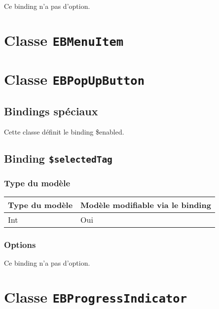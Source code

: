 Ce binding n'a pas d'option.








\section{Classe \texttt{EBMenuItem}}








\section{Classe \texttt{EBPopUpButton}}

\subsection{Bindings spéciaux}

Cette classe définit le binding \$enabled.

\subsection{Binding \texttt{\$selectedTag}}

\subsubsection{Type du modèle}

\begin{tabular}{|l|l|}
\hline
\textbf{Type du modèle} & \textbf{Modèle modifiable via le binding}\\
\hline
Int & Oui\\
\hline
\end{tabular}
\subsubsection{Options}

Ce binding n'a pas d'option.








\section{Classe \texttt{EBProgressIndicator}}








